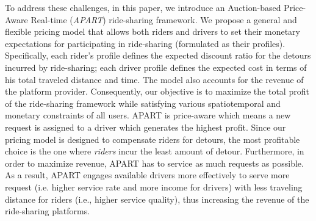 To address these challenges, in this paper, we introduce an Auction-based Price-Aware Real-time (\textit{APART}) ride-sharing framework. We propose a general and flexible pricing model that allows both riders and drivers to set their monetary expectations for participating in ride-sharing (formulated as their profiles). Specifically, each rider's profile defines the expected discount ratio for the detours incurred by ride-sharing; each driver profile defines the expected cost in terms of his total traveled distance and time. The model also accounts for the revenue of the platform provider. Consequently, our objective is to maximize the total profit of the ride-sharing framework while satisfying various spatiotemporal and monetary constraints of all users. APART is price-aware which means a new request is assigned to a driver which generates the highest profit. Since our pricing model is designed to compensate riders for detours, the most profitable choice is the one where \textit{riders} incur the least amount of detour. Furthermore, in order to maximize revenue, APART has to service as much requests as possible. As a result, APART engages available drivers more effectively to serve more request (i.e. higher service rate and more income for drivers) with less traveling distance for riders (i.e., higher service quality), thus increasing the revenue of the ride-sharing platforms.




